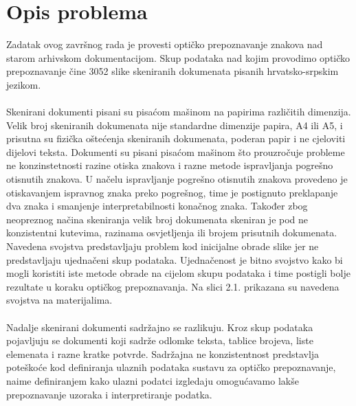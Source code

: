 \documentclass[times, utf8, zavrsni, numeric]{fer}
\begin{document}
\chapter{Opis problema}
Zadatak ovog završnog rada je provesti optičko prepoznavanje znakova nad starom arhivskom dokumentacijom. Skup podataka nad kojim provodimo optičko prepoznavanje čine 3052 slike skeniranih dokumenata pisanih hrvatsko-srpskim jezikom.
\\
\\
Skenirani dokumenti pisani su pisaćom mašinom na papirima različitih dimenzija. Velik broj skeniranih dokumenata nije standardne dimenzije papira, A4 ili A5, i prisutna su fizička oštećenja skeniranih dokumenata, poderan papir i ne cjeloviti dijelovi teksta. Dokumenti su pisani pisaćom mašinom što prouzročuje probleme ne konzinstetnosti razine otiska znakova i razne metode ispravljanja pogrešno otisnutih znakova. U načelu ispravljanje pogrešno otisnutih znakova provedeno je otiskavanjem ispravnog znaka preko pogrešnog, time je postignuto preklapanje dva znaka i smanjenje interpretabilnosti konačnog znaka.
Također zbog neopreznog načina skeniranja velik broj dokumenata skeniran je pod ne konzistentni kutevima, razinama osvjetljenja ili brojem prisutnih dokumenata.
Navedena svojstva predstavljaju problem kod inicijalne obrade slike jer ne predstavljaju ujednačeni skup podataka. Ujednačenost je bitno svojstvo kako bi mogli koristiti iste metode obrade na cijelom skupu podataka i time postigli bolje rezultate u koraku optičkog prepoznavanja. Na slici 2.1. prikazana su navedena svojstva na materijalima.
\\
\\
Nadalje skenirani dokumenti sadržajno se razlikuju. Kroz skup podataka pojavljuju se dokumenti koji sadrže odlomke teksta, tablice brojeva, liste elemenata i razne kratke potvrde. Sadržajna ne konzistentnost predstavlja poteškoće kod definiranja ulaznih podataka sustavu za optičko prepoznavanje, naime definiranjem kako ulazni podatci izgledaju omogućavamo lakše prepoznavanje uzoraka i interpretiranje podatka.
\end{document}
